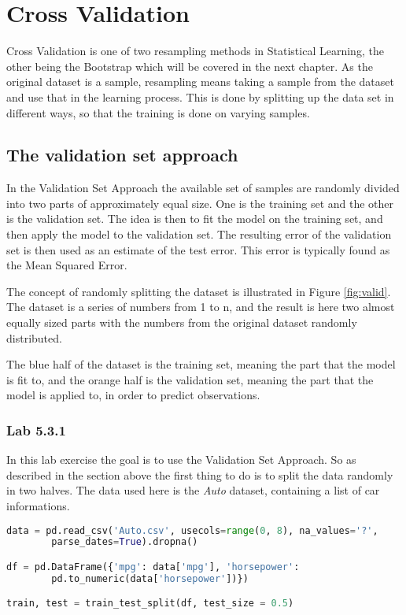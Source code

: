 \chapter{Cross Validation}
\label{chp:crossval}
Cross Validation is one of two resampling methods in Statistical Learning, the other being the Bootstrap which will be covered in the next chapter. As the original dataset is a sample, resampling means taking a sample from the dataset and use that in the learning process. This is done by splitting up the data set in different ways, so that the training is done on varying samples. 

\section{The validation set approach}
In the Validation Set Approach the available set of samples are randomly divided into two parts of approximately equal size. One is the training set and the other is the validation set. The idea is then to fit the model on the training set, and then apply the model to the validation set. The resulting error of the validation set is then used as an estimate of the test error. This error is typically found as the Mean Squared Error. 


The concept of randomly splitting the dataset is illustrated in Figure \ref{fig:valid}. The dataset is a series of numbers from 1 to n, and the result is here two almost equally sized parts with the numbers from the original dataset randomly distributed. 

The blue half of the dataset is the training set, meaning the part that the model is fit to, and the orange half is the validation set, meaning the part that the model is applied to, in order to predict observations. 

\subsection{Lab 5.3.1}
In this lab exercise the goal is to use the Validation Set Approach. So as described in the section above the first thing to do is to split the data randomly in two halves. The data used here is the \emph{Auto} dataset, containing a list of car informations. 

\begin{lstlisting}[language=Python, label=lst:lst_valid, caption=Auto dataset randomly split]
data = pd.read_csv('Auto.csv', usecols=range(0, 8), na_values='?',
		parse_dates=True).dropna()

df = pd.DataFrame({'mpg': data['mpg'], 'horsepower':  
		pd.to_numeric(data['horsepower'])})

train, test = train_test_split(df, test_size = 0.5)
\end{lstlisting}

